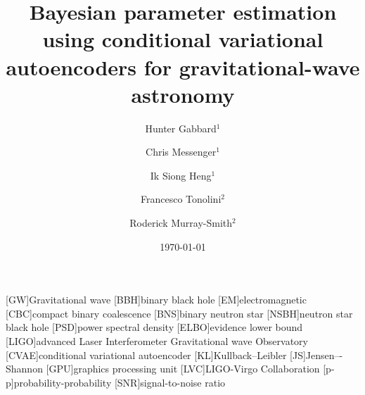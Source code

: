 \documentclass[%
showpacs,
nofootinbib,
 amsmath,amssymb,
 aps,
 twocolumn,
 prl,
 reprint,
floatfix,
]{revtex4-1}
\begin{document}

\title{Bayesian parameter estimation using conditional variational autoencoders
for gravitational-wave astronomy}

\author{Hunter Gabbard$^1$}
\author{Chris Messenger$^1$}
\author{Ik Siong Heng$^1$}
\author{Francesco Tonolini$^2$}
\author{Roderick Murray-Smith$^2$}


\date{\today}

\maketitle

%

[GW]{Gravitational wave}
[BBH]{binary black hole}
[EM]{electromagnetic}
[CBC]{compact binary coalescence}
[BNS]{binary neutron star}
[NSBH]{neutron star black hole}
[PSD]{power spectral density}
[ELBO]{evidence lower bound}
[LIGO]{advanced Laser Interferometer Gravitational wave Observatory}
[CVAE]{conditional variational autoencoder}
[KL]{Kullback--Leibler}
[JS]{Jensen–-Shannon}
[GPU]{graphics processing unit}
[LVC]{LIGO-Virgo Collaboration}
[p-p]{probability-probability}
[SNR]{signal-to-noise ratio}
\end{document}
